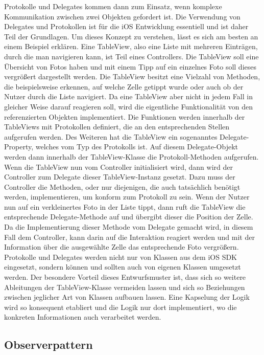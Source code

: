 \documentclass[11pt,a4paper]{report}
\begin{document}
Protokolle und Delegates kommen dann zum Einsatz, wenn komplexe Kommunikation zwischen zwei Objekten gefordert ist. Die Verwendung von Delegates und Protokollen ist für die iOS Entwicklung essentiell und ist daher Teil der Grundlagen. Um dieses Konzept zu verstehen, lässt es sich am besten an einem Beispiel erklären. Eine TableView, also eine Liste mit mehreren Einträgen, durch die man navigieren kann, ist Teil eines Controllers. Die TableView soll eine Übersicht von Fotos haben und mit einem Tipp auf ein einzelnes Foto soll dieses vergrößert dargestellt werden. Die TableView besitzt eine Vielzahl von Methoden, die beispielsweise erkennen, auf welche Zelle getippt wurde oder auch ob der Nutzer durch die Liste navigiert. Da eine TableView aber nicht in jedem Fall in gleicher Weise darauf reagieren soll, wird die eigentliche Funktionalität von den referenzierten Objekten implementiert. Die Funktionen werden innerhalb der TableViews mit Protokollen definiert, die an den entsprechenden Stellen aufgerufen werden. Des Weiteren hat die TableView ein sogenanntes Delegate-Property, welches vom Typ des Protokolls ist. Auf diesem Delegate-Objekt werden dann innerhalb der TableView-Klasse die Protokoll-Methoden aufgerufen. Wenn die TableView nun vom Controller initialisiert wird, dann wird der Controller zum Delegate dieser TableView-Instanz gesetzt. Dazu muss der Controller die Methoden, oder nur diejenigen, die auch tatsächlich benötigt werden, implementieren, um konform zum Protokoll zu sein. Wenn der Nutzer nun auf ein verkleinertes Foto in der Liste tippt, dann ruft die TableView die entsprechende Delegate-Methode auf und übergibt dieser die Position der Zelle. Da die Implementierung dieser Methode vom Delegate gemacht wird, in diesem Fall dem Controller, kann darin auf die Interaktion reagiert werden und mit der Information über die ausgewählte Zelle das entsprechende Foto vergrößern. Protokolle und Delegates werden nicht nur von Klassen aus dem iOS SDK eingesetzt, sondern können und sollten auch von eigenen Klassen umgesetzt werden. Der besondere Vorteil dieses Entwurfsmuster ist, dass sich so weitere Ableitungen der TableView-Klasse vermeiden lassen und sich so Beziehungen zwischen jeglicher Art von Klassen aufbauen lassen. Eine Kapselung der Logik wird so konsequent etabliert und die Logik nur dort implementiert, wo die konkreten Informationen auch verarbeitet werden. \cite{appsfuerios} \cite{WorkingwithProtocols}

\subsection{Observerpattern}
\end{document}
